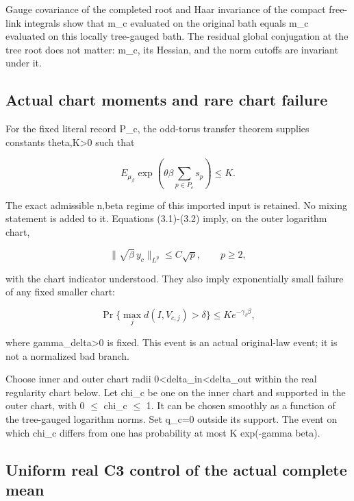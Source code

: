 \documentclass[
  11pt,
]{article}
\begin{document}
Gauge covariance of the completed root and Haar invariance of the
compact free-link integrals show that m\_c evaluated on the original
bath equals m\_c evaluated on this locally tree-gauged bath. The
residual global conjugation at the tree root does not matter: m\_c, its
Hessian, and the norm cutoffs are invariant under it.

\hypertarget{actual-chart-moments-and-rare-chart-failure}{%
\subsection{Actual chart moments and rare chart
failure}\label{actual-chart-moments-and-rare-chart-failure}}

For the fixed literal record P\_c, the odd-torus transfer theorem supplies constants
theta,K\textgreater0 such that

\[
 E_{\mu_\beta}\exp\left(\theta\beta\sum_{p\in P_c}s_p\right)
 \le K.
\tag{4.1}
\]

The exact admissible n,beta regime of this imported input is retained.
No mixing statement is added to it. Equations (3.1)-(3.2) imply, on the
outer logarithm chart,

\[
 \|\sqrt\beta\,y_c\|_{L^p}\le C\sqrt p,
 \qquad p\ge2,
\tag{4.2}
\]

with the chart indicator understood. They also imply exponentially small
failure of any fixed smaller chart:

\[
 \Pr\{\max_jd(I,V_{c,j})>\delta\}
 \le K e^{-\gamma_\delta\beta},
\tag{4.3}
\]

where gamma\_delta\textgreater0 is fixed. This event is an actual
original-law event; it is not a normalized bad branch.

Choose inner and outer chart radii
0\textless delta\_in\textless delta\_out within the real regularity
chart below. Let chi\_c be one on the inner chart and supported in the
outer chart, with 0 \(\leq\) chi\_c \(\leq\) 1. It can be chosen
smoothly as a function of the tree-gauged logarithm norms. Set q\_c=0
outside its support. The event on which chi\_c differs from one has
probability at most K exp(-gamma beta).

\hypertarget{uniform-real-c3-control-of-the-actual-complete-mean}{%
\subsection{Uniform real C3 control of the actual complete
mean}\label{uniform-real-c3-control-of-the-actual-complete-mean}}
\end{document}
